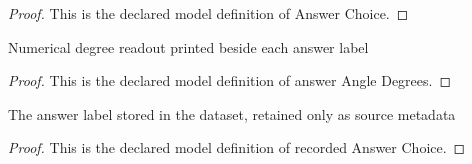 \begin{proof}
  This is the declared model definition of Answer Choice.
\end{proof}
\begin{definition}
  \label{def:physics:phyx-mini-0097:phyxminiproblems-problemphyxmini0097-answerangledegrees}
  Numerical degree readout printed beside each answer label
\end{definition}
\begin{proof}
  This is the declared model definition of answer Angle Degrees.
\end{proof}
\begin{definition}
  \label{def:physics:phyx-mini-0097:phyxminiproblems-problemphyxmini0097-recordedanswerchoice}
  The answer label stored in the dataset, retained only as source metadata
\end{definition}
\begin{proof}
  This is the declared model definition of recorded Answer Choice.
\end{proof}
